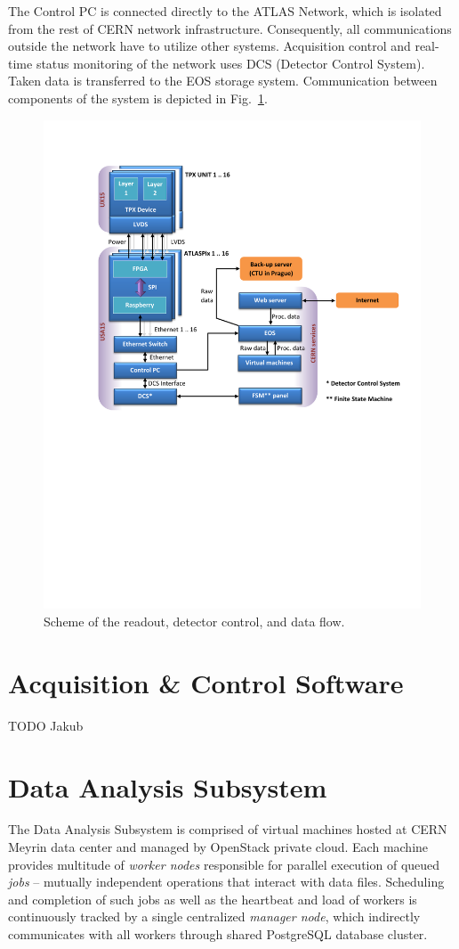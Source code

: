 \documentclass[journal]{IEEEtran}
\begin{document}
The Control PC is connected directly to the ATLAS Network, which is isolated from the rest of CERN network infrastructure. Consequently, all communications outside the network have to utilize other systems. Acquisition control and real-time status monitoring of the network uses DCS (Detector Control System). Taken data is transferred to the EOS storage system. Communication between components of the system is depicted in Fig.~\ref{fig:data_flow}.

\begin{figure}[tbp]
	\centering
        \includegraphics[clip, trim={2cm 11.2cm 0cm 2.6cm}, width=.5\textwidth, angle = 0 ]{Plots/Doc1.pdf}
      \caption {Scheme of the readout, detector control, and data flow.}
    \label{fig:data_flow}
\end{figure}

\section{\label{sec:acquisition}Acquisition \& Control Software}
TODO Jakub

\section{\label{sec:analysis}Data Analysis Subsystem}
The Data Analysis Subsystem is comprised of virtual machines hosted at CERN Meyrin data center and managed by OpenStack private cloud. Each machine provides multitude of \textit{worker nodes} responsible for parallel execution of queued \textit{jobs} -- mutually independent operations that interact with data files. Scheduling and completion of such jobs as well as the heartbeat and load of workers is continuously tracked by a single centralized \textit{manager node}, which indirectly communicates with all workers through shared PostgreSQL database cluster.
\end{document}
